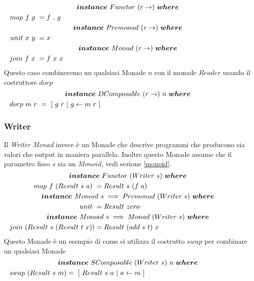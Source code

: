 \begin{align*}
  \classdef{\bm{instance}\ Functor\ (r \to)\ \bm{where}}
  map\ f\ g\ &= f\ .\ g\\
  \classdef{\bm{instance}\ Premonad\ (r \to)\ \bm{where}}
  unit\ x\ y\ &= x\\
  \classdef{\bm{instance}\ Monad\ (r \to)\ \bm{where}}
  join\ f\ x\ &= f\ x\ x\\
\end{align*}
Questo caso combineremo un qualsiasi Monade $n$ con il monade $Reader$ usando il
costruttore $dorp$
\begin{align*}
  \classdef{\bm{instance}\ DComposable\ (r \to)\ n\ \bm{where}}
  dorp\ m\ r\ &=\ [\ g\ r\ |\ g \leftarrow m\ r\ ]
\end{align*}

\subsubsection*{Writer}
Il \textit{Writer Monad} invece è un Monade che descrive programmi che producono
sia valori che output in maniera parallela.
Inoltre questo Monade assume che il parametro fisso $s$ sia un $Monoid$, vedi
sezione \ref{monoid}.
\begin{align*}
  \classdef{\bm{instance}\ Functor\ (Writer\ s)\ \bm{where}}
  map\ f\ (Result\ s\ a)\ &= Result\ s\ (f\ a)\\
  \classdef{\bm{instance}\ Monoid\ s \implies Premonad\ (Writer\ s)\ \bm{where}}
  unit\ &= Result\ zero\\
  \classdef{\bm{instance}\ Monoid\ s \implies Monad\ (Writer\ s)\ \bm{where}}
  join\ (Result\ s\ (Result\ t\ x)) &= Result\ (add\ s\ t)\ x\\
\end{align*}
Questo Monade è un esempio di come si utilizza il costrutto $swap$ per combinare
un qualsiasi Monade
\begin{align*}
  \classdef{\bm{instance}\ SComposable\ (Writer\ s)\ n\ \bm{where}}
  swap\ (Result\ s\ m) &=\ [\ Result\ s\ a\ |\ a \leftarrow m\ ]
\end{align*}


